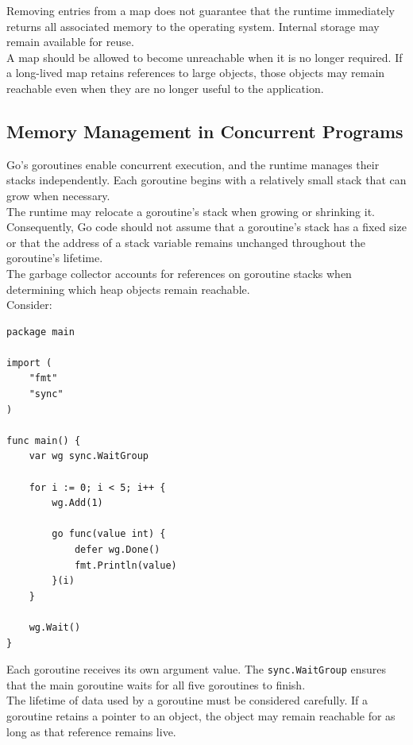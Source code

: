 Removing entries from a map does not guarantee that the runtime immediately returns all associated memory to the operating system. Internal storage may remain available for reuse.\\

A map should be allowed to become unreachable when it is no longer required. If a long-lived map retains references to large objects, those objects may remain reachable even when they are no longer useful to the application.\\

\subsection{Memory Management in Concurrent Programs}

Go's goroutines enable concurrent execution, and the runtime manages their stacks independently. Each goroutine begins with a relatively small stack that can grow when necessary.\\

The runtime may relocate a goroutine's stack when growing or shrinking it. Consequently, Go code should not assume that a goroutine's stack has a fixed size or that the address of a stack variable remains unchanged throughout the goroutine's lifetime.\\

The garbage collector accounts for references on goroutine stacks when determining which heap objects remain reachable.\\

Consider:

\begin{lstlisting}
package main

import (
    "fmt"
    "sync"
)

func main() {
    var wg sync.WaitGroup

    for i := 0; i < 5; i++ {
        wg.Add(1)

        go func(value int) {
            defer wg.Done()
            fmt.Println(value)
        }(i)
    }

    wg.Wait()
}
\end{lstlisting}

Each goroutine receives its own argument value. The \texttt{sync.WaitGroup} ensures that the main goroutine waits for all five goroutines to finish.\\

The lifetime of data used by a goroutine must be considered carefully. If a goroutine retains a pointer to an object, the object may remain reachable for as long as that reference remains live.\\

